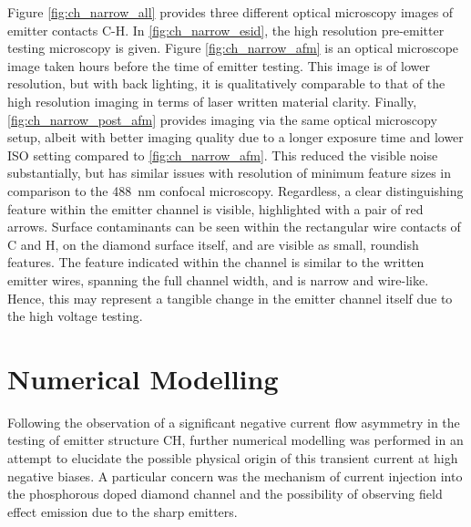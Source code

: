 \begin{refsection}
Figure \ref{fig:ch_narrow_all} provides three different optical microscopy images of emitter contacts C-H. In \ref{fig:ch_narrow_esid}, the high resolution pre-emitter testing microscopy is given. Figure \ref{fig:ch_narrow_afm} is an optical microscope image taken hours before the time of emitter testing. This image is of lower resolution, but with back lighting, it is qualitatively comparable to that of the high resolution imaging in terms of laser written material clarity. Finally, \ref{fig:ch_narrow_post_afm} provides imaging via the same optical microscopy setup, albeit with better imaging quality due to a longer exposure time and lower ISO setting compared to \ref{fig:ch_narrow_afm}. This reduced the visible noise substantially, but has similar issues with resolution of minimum feature sizes in comparison to the 488~\si{\nano\metre} confocal microscopy. Regardless, a clear distinguishing feature within the emitter channel is visible, highlighted with a pair of red arrows. Surface contaminants can be seen within the rectangular wire contacts of C and H, on the diamond surface itself, and are visible as small, roundish features. The feature indicated within the channel is similar to the written emitter wires, spanning the full channel width, and is narrow and wire-like. Hence, this may represent a tangible change in the emitter channel itself due to the high voltage testing.

\section{Numerical Modelling}
\label{sec:modelling}
Following the observation of a significant negative current flow asymmetry in the testing of emitter structure CH, further numerical modelling was performed in an attempt to elucidate the possible physical origin of this transient current at high negative biases. A particular concern was the mechanism of current injection into the phosphorous doped diamond channel and the possibility of observing field effect emission due to the sharp emitters.


\end{refsection}
